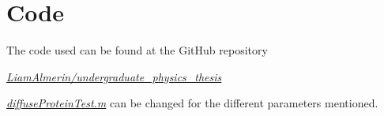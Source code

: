 \appendix{}
\chapter{Code}
The code used can be found at the GitHub repository

\href{https://github.com/LiamAlmerin/undergraduate_physics_thesis/tree/main/Code}{\textit{LiamAlmerin/undergraduate\_physics\_thesis}}

\href{https://github.com/LiamAlmerin/undergraduate_physics_thesis/blob/main/Code/diffuseProteinTest.m}{\textit{diffuseProteinTest.m}} can be changed for the different parameters mentioned.
